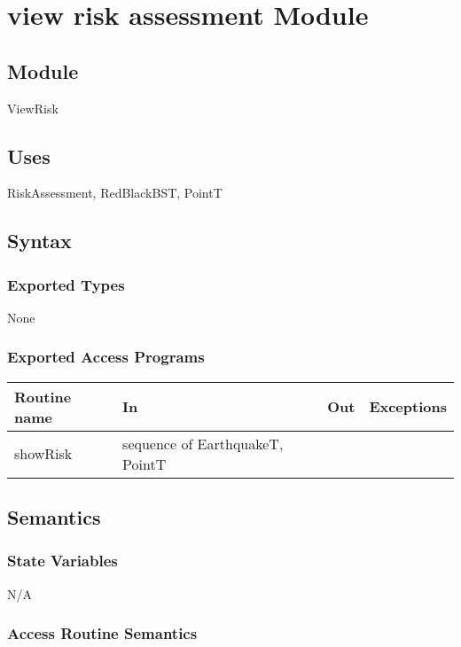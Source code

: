\documentclass[12pt]{article}
\begin{document}
\newpage

\section* {view risk assessment Module}

\subsection* {Module}

ViewRisk

\subsection* {Uses}

RiskAssessment, RedBlackBST, PointT

\subsection* {Syntax}

\subsubsection* {Exported Types}

None

\subsubsection* {Exported Access Programs}

\begin{tabular}{| l | l | l | p{6cm} |}
\hline
\textbf{Routine name} & \textbf{In} & \textbf{Out} & \textbf{Exceptions}\\
\hline
showRisk & sequence of EarthquakeT, PointT &  &  ~\\
\hline
\end{tabular}

\subsection* {Semantics}

\subsubsection* {State Variables}

N/A


\subsubsection* {Access Routine Semantics}
\end{document}
